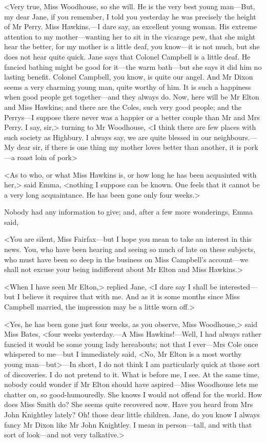 <Very true, Miss Woodhouse, so she will. He is the very best young man—But, my dear Jane, if you remember, I told you yesterday he was precisely the height of Mr Perry. Miss Hawkins,—I dare say, an excellent young woman. His extreme attention to my mother—wanting her to sit in the vicarage pew, that she might hear the better, for my mother is a little deaf, you know—it is not much, but she does not hear quite quick. Jane says that Colonel Campbell is a little deaf. He fancied bathing might be good for it—the warm bath—but she says it did him no lasting benefit. Colonel Campbell, you know, is quite our angel. And Mr Dixon seems a very charming young man, quite worthy of him. It is such a happiness when good people get together—and they always do. Now, here will be Mr Elton and Miss Hawkins; and there are the Coles, such very good people; and the Perrys—I suppose there never was a happier or a better couple than Mr and Mrs Perry. I say, sir,> turning to Mr Woodhouse, <I think there are few places with such society as Highbury. I always say, we are quite blessed in our neighbours.—My dear sir, if there is one thing my mother loves better than another, it is pork—a roast loin of pork\longdash>

<As to who, or what Miss Hawkins is, or how long he has been acquainted with her,> said Emma, <nothing I suppose can be known. One feels that it cannot be a very long acquaintance. He has been gone only four weeks.>

Nobody had any information to give; and, after a few more wonderings, Emma said,

<You are silent, Miss Fairfax—but I hope you mean to take an interest in this news. You, who have been hearing and seeing so much of late on these subjects, who must have been so deep in the business on Miss Campbell's account—we shall not excuse your being indifferent about Mr Elton and Miss Hawkins.>

<When I have seen Mr Elton,> replied Jane, <I dare say I shall be interested—but I believe it requires that with me. And as it is some months since Miss Campbell married, the impression may be a little worn off.>

<Yes, he has been gone just four weeks, as you observe, Miss Woodhouse,> said Miss Bates, <four weeks yesterday.—A Miss Hawkins!—Well, I had always rather fancied it would be some young lady hereabouts; not that I ever—Mrs Cole once whispered to me—but I immediately said, <No, Mr Elton is a most worthy young man—but>—In short, I do not think I am particularly quick at those sort of discoveries. I do not pretend to it. What is before me, I see. At the same time, nobody could wonder if Mr Elton should have aspired—Miss Woodhouse lets me chatter on, so good-humouredly. She knows I would not offend for the world. How does Miss Smith do? She seems quite recovered now. Have you heard from Mrs John Knightley lately? Oh! those dear little children. Jane, do you know I always fancy Mr Dixon like Mr John Knightley. I mean in person—tall, and with that sort of look—and not very talkative.>


